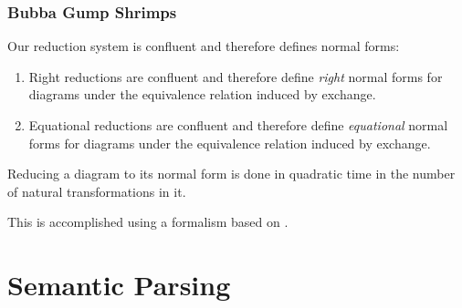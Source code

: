 \documentclass[math, english, info]{beamercours}
\begin{document}
\begin{frame}[allowframebreaks]
	\frametitle{Bubba Gump Shrimps}
	\begin{thm}[Confluence]\label{thm:confluence}
		Our reduction system is confluent and therefore defines normal forms:
		\begin{enumerate}
			\item Right reductions are confluent and therefore define \emph{right} normal forms for
			      diagrams under the equivalence relation induced by exchange.
			\item Equational reductions are confluent and therefore define \emph{equational}
			      normal forms for diagrams under the equivalence relation induced by exchange.
		\end{enumerate}
	\end{thm}

	\smallskip

	\begin{thm}
		\label{thm:normalize}
		Reducing a diagram to its normal form is done in quadratic time in
		the number of natural transformations in it.
	\end{thm}
	This is accomplished using a formalism based on \cite{delpeuchNormalizationPlanarString2022}.
\end{frame}

\section{Semantic Parsing}
\end{document}
